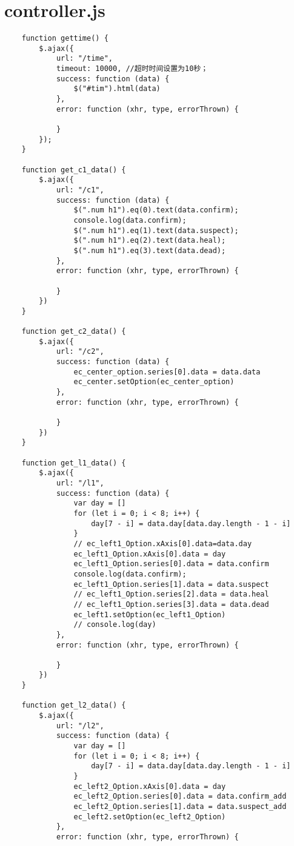 \section{controller.js}
\begin{lstlisting}
    function gettime() {
        $.ajax({
            url: "/time",
            timeout: 10000, //超时时间设置为10秒；
            success: function (data) {
                $("#tim").html(data)
            },
            error: function (xhr, type, errorThrown) {
    
            }
        });
    }
    
    function get_c1_data() {
        $.ajax({
            url: "/c1",
            success: function (data) {
                $(".num h1").eq(0).text(data.confirm);
                console.log(data.confirm);
                $(".num h1").eq(1).text(data.suspect);
                $(".num h1").eq(2).text(data.heal);
                $(".num h1").eq(3).text(data.dead);
            },
            error: function (xhr, type, errorThrown) {
    
            }
        })
    }
    
    function get_c2_data() {
        $.ajax({
            url: "/c2",
            success: function (data) {
                ec_center_option.series[0].data = data.data
                ec_center.setOption(ec_center_option)
            },
            error: function (xhr, type, errorThrown) {
    
            }
        })
    }
    
    function get_l1_data() {
        $.ajax({
            url: "/l1",
            success: function (data) {
                var day = []
                for (let i = 0; i < 8; i++) {
                    day[7 - i] = data.day[data.day.length - 1 - i]
                }
                // ec_left1_Option.xAxis[0].data=data.day
                ec_left1_Option.xAxis[0].data = day
                ec_left1_Option.series[0].data = data.confirm
                console.log(data.confirm);
                ec_left1_Option.series[1].data = data.suspect
                // ec_left1_Option.series[2].data = data.heal
                // ec_left1_Option.series[3].data = data.dead
                ec_left1.setOption(ec_left1_Option)
                // console.log(day)
            },
            error: function (xhr, type, errorThrown) {
    
            }
        })
    }
    
    function get_l2_data() {
        $.ajax({
            url: "/l2",
            success: function (data) {
                var day = []
                for (let i = 0; i < 8; i++) {
                    day[7 - i] = data.day[data.day.length - 1 - i]
                }
                ec_left2_Option.xAxis[0].data = day
                ec_left2_Option.series[0].data = data.confirm_add
                ec_left2_Option.series[1].data = data.suspect_add
                ec_left2.setOption(ec_left2_Option)
            },
            error: function (xhr, type, errorThrown) {
    

\end{lstlisting}
